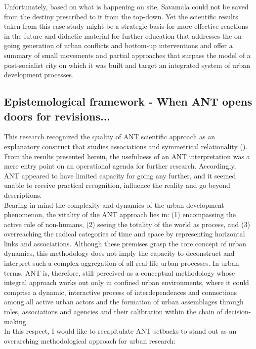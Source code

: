 \documentclass[11pt]{report}
\begin{document}
{{{Unfortunately, based on what is happening on site, Savamala could not be saved from the destiny prescribed to it from the top-down. Yet the scientific results taken from this case study might be a strategic basis for more effective reactions in the future and didactic material for further education that addresses the on-going generation of urban conflicts and bottom-up interventions and offer a summary of small movements and partial approaches that surpass the model of a post-socialist city on which it was built and target an integrated system of urban development processes.

\subsection{Epistemological framework - When ANT opens doors for revisions...}
 
This research recognized the quality of ANT scientific approach as an explanatory construct that studies associations and symmetrical relationality (\href{ref}{\citealt{farias_urban_2011}}).
From the results presented herein, the usefulness of an ANT interpretation was a mere entry point on an operational agenda for further research. Accordingly, ANT appeared to have limited capacity for going any further, and it seemed unable to receive practical recognition, influence the reality and go beyond descriptions.
\\

Bearing in mind the complexity and dynamics of the urban development phenomenon, the vitality of the ANT approach lies in: (1) encompassing the active role of non-humans, (2) seeing the totality of the world as process, and (3) overreaching the radical categories of time and space by representing horizontal links and associations. Although these premises grasp the core concept of urban dynamics, this methodology does not imply the capacity to deconstruct and interpret such a complex aggregation of all real-life urban processes. In urban terms, ANT is, therefore, still perceived as a conceptual methodology whose integral approach works out only in confined urban environments, where it could comprise a dynamic, interactive process of interdependences and connections among all active urban actors and the formation of urban assemblages through roles, associations and agencies and their calibration within the chain of decision-making.
\\

In this respect, I would like to recapitulate ANT setbacks to stand out as an overarching methodological approach for urban research:

}}}
\end{document}
